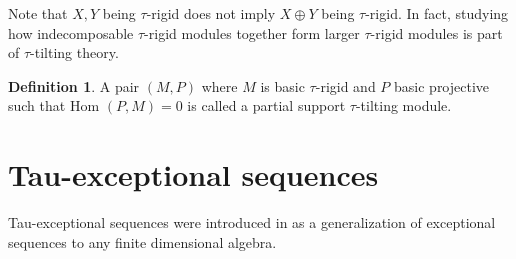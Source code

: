 \documentclass[]{article}
\theoremstyle{definition}
\newtheorem{definition}{Definition}[section]
\newcommand{\Hom}{\ensuremath{\text{Hom }}}
\begin{document}
Note that $X,Y$ being $\tau$-rigid does not imply $X \oplus Y$ being $\tau$-rigid. In fact, studying how indecomposable $\tau$-rigid modules together form larger $\tau$-rigid modules is part of $\tau$-tilting theory.

\begin{definition}
	A pair $(M,P)$ where $M$ is basic $\tau$-rigid and $P$ basic projective such that $\Hom(P,M) = 0$ is called a partial support $\tau$-tilting module.
\end{definition}



\section{Tau-exceptional sequences}
Tau-exceptional sequences were introduced in \cite{buantau2020} as a generalization of exceptional sequences to any finite dimensional algebra.





\printbibliography
\end{document}
